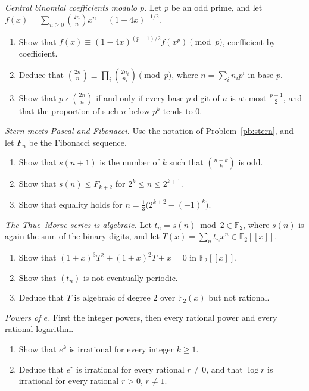 \begin{exercise}[$\star\star$]\label{pb:centralp}
\emph{Central binomial coefficients modulo $p$.} Let $p$ be an odd prime, and let $f(x)=\sum_{n\ge0}\binom{2n}nx^n=(1-4x)^{-1/2}$.
\begin{enumerate}[label=(\alph*)]
\item Show that $f(x)\equiv(1-4x)^{(p-1)/2}f(x^p)\pmod p$, coefficient by coefficient.
\item Deduce that $\binom{2n}n\equiv\prod_i\binom{2n_i}{n_i}\pmod p$, where $n=\sum_in_ip^i$ in base $p$.
\item Show that $p\nmid\binom{2n}n$ if and only if every base-$p$ digit of $n$ is at most $\frac{p-1}2$, and that the proportion of
such $n$ below $p^k$ tends to $0$.
\end{enumerate}
\end{exercise}

\begin{exercise}[$\star\star$]\label{pb:sternfib}
\emph{Stern meets Pascal and Fibonacci.} Use the notation of Problem~\ref{pb:stern}, and let $F_n$ be the Fibonacci sequence.
\begin{enumerate}[label=(\alph*)]
\item Show that $s(n+1)$ is the number of $k$ such that $\binom{n-k}k$ is odd.
\item Show that $s(n)\le F_{k+2}$ for $2^k\le n\le2^{k+1}$.
\item Show that equality holds for $n=\frac13\bigl(2^{k+2}-(-1)^k\bigr)$.
\end{enumerate}
\end{exercise}

\begin{exercise}[$\star\star$]\label{pb:thuemorse}
\emph{The Thue--Morse series is algebraic.} Let $t_n=s(n)\bmod2\in\mathbb F_2$, where $s(n)$ is again the sum of the binary digits, and let $T(x)=\sum_nt_nx^n\in\mathbb F_2[[x]]$.
\begin{enumerate}[label=(\alph*)]
\item Show that $(1+x)^3T^2+(1+x)^2T+x=0$ in $\mathbb F_2[[x]]$.
\item Show that $(t_n)$ is not eventually periodic.
\item Deduce that $T$ is algebraic of degree $2$ over $\mathbb F_2(x)$ but not rational.
\end{enumerate}
\end{exercise}

\begin{exercise}[$\star\star$]\label{pb:hermite}
\emph{Powers of $e$.} First the integer powers, then every rational power and every rational logarithm.
\begin{enumerate}[label=(\alph*)]
\item Show that $e^k$ is irrational for every integer $k\ge1$.
\item Deduce that $e^r$ is irrational for every rational $r\ne0$, and that $\log r$ is irrational for every rational $r>0$, $r\ne1$.
\end{enumerate}
\end{exercise}

